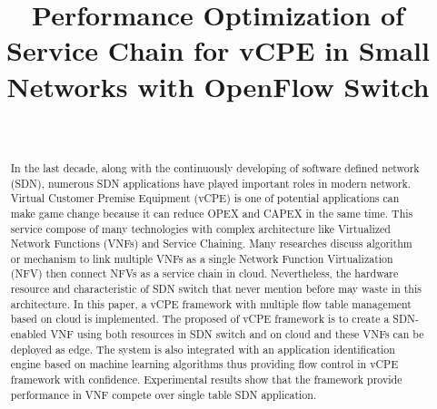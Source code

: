 \documentclass[journal]{IEEEtran}
\begin{document}
\title{Performance Optimization of Service Chain for vCPE in Small Networks with OpenFlow Switch}

\author{

 \\
}


\maketitle


\begin{abstract}
In the last decade, along with the continuously developing of software defined network (SDN), numerous SDN applications have played important roles in modern network. Virtual Customer Premise Equipment (vCPE) is one of potential applications can make game change because it can reduce OPEX and CAPEX in the same time. This service compose of many technologies with complex architecture like Virtualized Network Functions (VNFs) and Service Chaining. Many researches discuss algorithm or mechanism to link multiple VNFs as a single Network Function Virtualization (NFV) then connect NFVs as a service chain in cloud. Nevertheless, the hardware resource and characteristic of SDN switch that never mention before may waste in this architecture. In this paper, a vCPE framework with multiple flow table management based on cloud is implemented. The proposed of vCPE framework is to create a SDN-enabled VNF using both resources in SDN switch and on cloud and these VNFs can be deployed as edge. The system is also integrated with an application identification engine based on machine learning algorithms thus providing flow control in vCPE framework with confidence. Experimental results show that the framework provide performance in VNF compete over single table SDN application.
\end{abstract}
\end{document}

